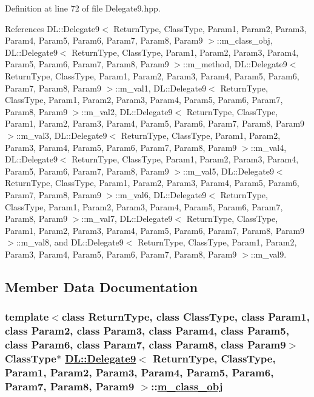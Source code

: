 Definition at line 72 of file Delegate9.hpp.

References DL::Delegate9$<$ Return\-Type, Class\-Type, Param1, Param2, Param3, Param4, Param5, Param6, Param7, Param8, Param9 $>$::m\_\-class\_\-obj, DL::Delegate9$<$ Return\-Type, Class\-Type, Param1, Param2, Param3, Param4, Param5, Param6, Param7, Param8, Param9 $>$::m\_\-method, DL::Delegate9$<$ Return\-Type, Class\-Type, Param1, Param2, Param3, Param4, Param5, Param6, Param7, Param8, Param9 $>$::m\_\-val1, DL::Delegate9$<$ Return\-Type, Class\-Type, Param1, Param2, Param3, Param4, Param5, Param6, Param7, Param8, Param9 $>$::m\_\-val2, DL::Delegate9$<$ Return\-Type, Class\-Type, Param1, Param2, Param3, Param4, Param5, Param6, Param7, Param8, Param9 $>$::m\_\-val3, DL::Delegate9$<$ Return\-Type, Class\-Type, Param1, Param2, Param3, Param4, Param5, Param6, Param7, Param8, Param9 $>$::m\_\-val4, DL::Delegate9$<$ Return\-Type, Class\-Type, Param1, Param2, Param3, Param4, Param5, Param6, Param7, Param8, Param9 $>$::m\_\-val5, DL::Delegate9$<$ Return\-Type, Class\-Type, Param1, Param2, Param3, Param4, Param5, Param6, Param7, Param8, Param9 $>$::m\_\-val6, DL::Delegate9$<$ Return\-Type, Class\-Type, Param1, Param2, Param3, Param4, Param5, Param6, Param7, Param8, Param9 $>$::m\_\-val7, DL::Delegate9$<$ Return\-Type, Class\-Type, Param1, Param2, Param3, Param4, Param5, Param6, Param7, Param8, Param9 $>$::m\_\-val8, and DL::Delegate9$<$ Return\-Type, Class\-Type, Param1, Param2, Param3, Param4, Param5, Param6, Param7, Param8, Param9 $>$::m\_\-val9.

\subsection{Member Data Documentation}
\hypertarget{classDL_1_1Delegate9_r0}{
\subsubsection[m\_\-class\_\-obj]{\setlength{\rightskip}{0pt plus 5cm}template$<$class Return\-Type, class Class\-Type, class Param1, class Param2, class Param3, class Param4, class Param5, class Param6, class Param7, class Param8, class Param9$>$ Class\-Type$\ast$ \hyperlink{classDL_1_1Delegate9}{DL::Delegate9}$<$ Return\-Type, Class\-Type, Param1, Param2, Param3, Param4, Param5, Param6, Param7, Param8, Param9 $>$::\hyperlink{classDL_1_1Delegate9_r0}{m\_\-class\_\-obj}}}
\label{classDL_1_1Delegate9_r0}




